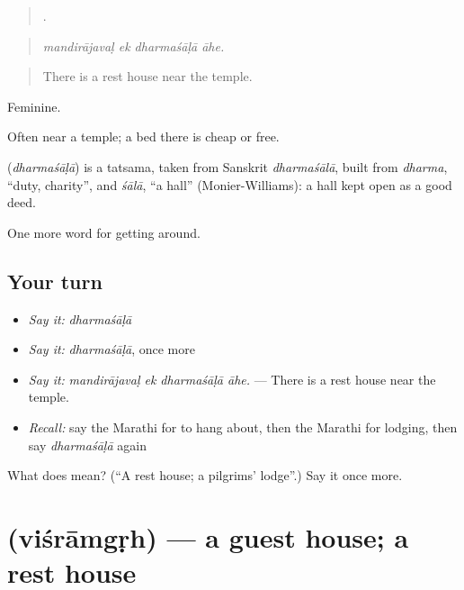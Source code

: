 \begin{quote}
   .
\end{quote}

\begin{quote}
\emph{mandirājavaḷ ek dharmaśāḷā āhe.}
\end{quote}

\begin{quote}
There is a rest house near the temple.
\end{quote}

Feminine.

Often near a temple; a bed there is cheap or free.

\begin{cousinweb}
\textbf{} (\emph{dharmaśāḷā}) is a tatsama, taken from Sanskrit \emph{dharmaśālā}, built from \emph{dharma}, \textquotedblleft{}duty, charity\textquotedblright{}, and \emph{śālā}, \textquotedblleft{}a hall\textquotedblright{} (Monier-Williams): a hall kept open as a good deed.
\end{cousinweb}

\begin{grammarlens}[title={What you've built}]
One more word for getting around.
\end{grammarlens}

\subsection*{Your turn}
\begin{itemize}
\raggedright
  \item \emph{Say it:} \emph{dharmaśāḷā}
  \item \emph{Say it:} \emph{dharmaśāḷā}, once more
  \item \emph{Say it:} \emph{mandirājavaḷ ek dharmaśāḷā āhe.} — There is a rest house near the temple.
  \item \emph{Recall:} say the Marathi for to hang about, then the Marathi for lodging, then say \emph{dharmaśāḷā} again
\end{itemize}

\begin{tcolorbox}[breakable,colback=teal!4,colframe=teal!35!black,title={Before you move on}]
What does  mean? (\textquotedblleft{}A rest house; a pilgrims’ lodge\textquotedblright{}.) Say it once more.
\end{tcolorbox}
\section[\texorpdfstring{\mr{विश्रामगृह} (viśrāmgṛh)}{विश्रामगृह (viśrāmgṛh)}]{ (viśrāmgṛh) — a guest house; a rest house}

